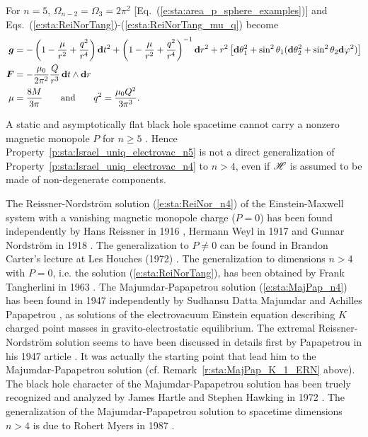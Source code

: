 \begin{example}
For $n=5$, $\Omega_{n-2} = \Omega_3 = 2\pi^2$ [Eq.~(\ref{e:sta:area_p_sphere_examples})]
and Eqs.~(\ref{e:sta:ReiNorTang})-(\ref{e:sta:ReiNorTang_mu_q}) become
\begin{align}
    \bm{g} & =  - \left( 1 - \frac{\mu}{r^2} + \frac{q^2}{r^{4}} \right)  \mathbf{d} t^2
    +  \left( 1 - \frac{\mu}{r^{2}} + \frac{q^2}{r^{4}}  \right) ^{-1} \mathbf{d} r^2
    + r^2 \left[ \mathbf{d}\theta_1^2 + \sin^2\theta_1( \mathbf{d}\theta_2^2 + \sin^2\theta_2 \mathbf{d}\varphi^2 ) \right]
        \nonumber \\
    \bm{F} & = - \frac{\mu_0}{2\pi^2} \frac{Q}{r^3} \,  \mathbf{d} t \wedge \mathbf{d} r  \nonumber \\
    \mu & = \frac{8 M}{3\pi} \qquad\mbox{and}\qquad
    q^2 = \frac{\mu_0 Q^2}{3\pi^3} . \nonumber
\end{align}
\end{example}


\begin{remark}
A static and asymptotically flat black hole spacetime cannot carry a nonzero magnetic monopole $P$
for $n \geq 5$ \cite{EmparOS10}. Hence Property~\ref{p:sta:Israel_uniq_electrovac_n5}
is not a direct generalization of Property~\ref{p:sta:Israel_uniq_electrovac_n4} to $n > 4$,
even if $\mathscr{H}$ is assumed to be made of non-degenerate components.
\end{remark}

\begin{hist}
The Reissner-Nordström solution (\ref{e:sta:ReiNor_n4})
of the Einstein-Maxwell system with a vanishing magnetic monopole charge ($P=0$) has been found independently by Hans Reissner
in 1916 \cite{Reiss1916}, Hermann Weyl in 1917 \cite{Weyl1917}
and Gunnar Nordström in 1918 \cite{Nords1918}.
The generalization to $P\neq 0$ can be found in Brandon Carter's
lecture at Les Houches (1972) \cite{Carte73a}.
The generalization to dimensions $n > 4$ with $P=0$, i.e. the solution (\ref{e:sta:ReiNorTang}),
has been obtained by Frank Tangherlini in 1963 \cite{Tangh63}.
The Majumdar-Papapetrou solution (\ref{e:sta:MajPap_n4}) has been found
in 1947 independently by Sudhansu Datta Majumdar \cite{Majum47}
and Achilles Papapetrou \cite{Papap47}, as solutions of the electrovacuum
Einstein equation describing $K$ charged point masses in gravito-electrostatic equilibrium.
The extremal Reissner-Nordström solution seems to have been discussed in details first
by Papapetrou in his 1947 article \cite{Papap47}. It was actually the starting point that lead
him to the Majumdar-Papapetrou solution (cf. Remark~\ref{r:sta:MajPap_K_1_ERN} above).
The black hole character of the Majumdar-Papapetrou solution has been truely recognized
and analyzed by James Hartle and Stephen Hawking
in 1972 \cite{HartlH72}. The generalization of the Majumdar-Papapetrou solution
to spacetime dimensions $n > 4$ is due to Robert Myers in 1987
\cite{Myers87}.
\end{hist}

